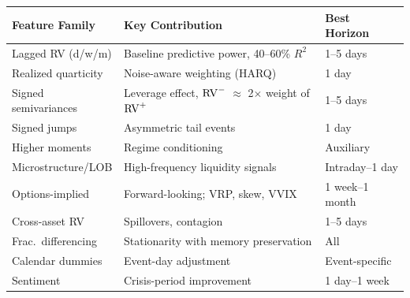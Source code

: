 \begin{keyresult}
\begin{center}
\begin{tabular}{p{3.8cm} p{5.5cm} p{3.5cm}}
\toprule
\textbf{Feature Family} & \textbf{Key Contribution} & \textbf{Best Horizon} \\
\midrule
Lagged RV (d/w/m) & Baseline predictive power, 40--60\% $R^2$ & 1--5 days \\
Realized quarticity & Noise-aware weighting (HARQ) & 1 day \\
Signed semivariances & Leverage effect, $\operatorname{RV}^-$ $\approx$ 2$\times$ weight of $\operatorname{RV}^+$ & 1--5 days \\
Signed jumps & Asymmetric tail events & 1 day \\
Higher moments & Regime conditioning & Auxiliary \\
Microstructure/LOB & High-frequency liquidity signals & Intraday--1 day \\
Options-implied & Forward-looking; VRP, skew, VVIX & 1 week--1 month \\
Cross-asset RV & Spillovers, contagion & 1--5 days \\
Frac.\ differencing & Stationarity with memory preservation & All \\
Calendar dummies & Event-day adjustment & Event-specific \\
Sentiment & Crisis-period improvement & 1 day--1 week \\
\bottomrule
\end{tabular}
\end{center}
\end{keyresult}

